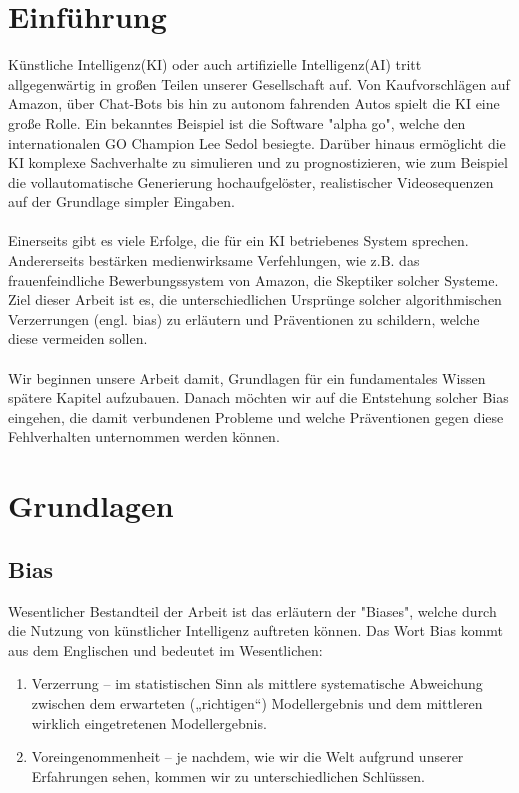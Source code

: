 \documentclass[12pt,oneside,a4paper,parskip]{scrbook}
\begin{document}
\chapter{Einführung}
\label{chapter:intro}
Künstliche Intelligenz(KI) oder auch artifizielle Intelligenz(AI) tritt allgegenwärtig in großen Teilen unserer Gesellschaft auf. Von Kaufvorschlägen auf Amazon, über Chat-Bots bis hin zu autonom fahrenden Autos spielt die KI eine große Rolle. Ein bekanntes Beispiel ist die Software "alpha go", welche den internationalen GO Champion Lee Sedol besiegte\cite{alphaGo}. Darüber hinaus ermöglicht die KI komplexe Sachverhalte zu simulieren und zu prognostizieren, wie zum Beispiel die vollautomatische Generierung hochaufgelöster, realistischer Videosequenzen auf der Grundlage simpler Eingaben\cite{videoToVideo}.
\\\\
Einerseits gibt es viele Erfolge, die für ein KI betriebenes System sprechen. Andererseits bestärken medienwirksame Verfehlungen, wie z.B. das frauenfeindliche Bewerbungssystem von Amazon\cite{amazon}, die Skeptiker solcher Systeme. Ziel dieser Arbeit ist es, die unterschiedlichen Ursprünge solcher algorithmischen Verzerrungen (engl. bias) zu erläutern und Präventionen zu schildern, welche diese vermeiden sollen.
\\\\
Wir beginnen unsere Arbeit damit, Grundlagen für ein fundamentales Wissen spätere Kapitel aufzubauen. Danach möchten wir auf die Entstehung solcher Bias eingehen, die damit verbundenen Probleme und welche Präventionen gegen diese Fehlverhalten unternommen werden können.
\chapter{Grundlagen}
\section{Bias}
Wesentlicher Bestandteil der Arbeit ist das erläutern der "Biases", welche durch die Nutzung von künstlicher Intelligenz auftreten können. Das Wort Bias kommt aus dem Englischen und bedeutet im Wesentlichen:

\begin{enumerate}
	\item Verzerrung – im statistischen Sinn als mittlere systematische Abweichung zwischen dem erwarteten („richtigen“) Modellergebnis und dem mittleren wirklich eingetretenen Modellergebnis.
	\item Voreingenommenheit – je nachdem, wie wir die Welt aufgrund unserer Erfahrungen sehen, kommen wir zu unterschiedlichen Schlüssen.
\end{enumerate}
\end{document}
